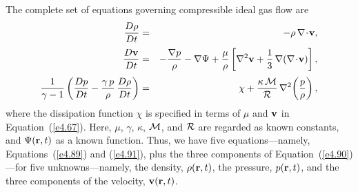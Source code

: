 The complete set of equations governing compressible ideal gas flow are
\begin{eqnarray}
\frac{D\rho}{Dt} &=& -\rho\,\nabla\!\cdot\!{\bf v},\label{e4.89}\\[0.5ex]
\frac{D{\bf v}}{Dt} &=& -\frac{\nabla p}{\rho} - \nabla\Psi+\frac{\mu}{\rho}\left[\nabla^2{\bf v} + \frac{1}{3}\,\nabla(\nabla\!\cdot\!{\bf v})\right],\label{e4.90}\\[0.5ex]
\frac{1}{\gamma-1}\left(\frac{Dp}{Dt} - \frac{\gamma\,p}{\rho}\,\frac{D\rho}{Dt}\right)
&=& \chi + \frac{\kappa\,{\cal M}}{\cal R}\,\nabla^2\!\left(\frac{p}{\rho}\right),\label{e4.91}
\end{eqnarray}
where the dissipation function $\chi$ is specified in terms of $\mu$ and ${\bf v}$ in Equation~(\ref{e4.67}). Here, $\mu$,
$\gamma$, $\kappa$, ${\cal M}$, and ${\cal R}$ are regarded as known constants, and $\Psi({\bf r}, t)$  as a known function. Thus, we have five equations---namely, Equations~(\ref{e4.89}) and (\ref{e4.91}), plus the three components of Equation~(\ref{e4.90})---for five 
unknowns---namely,
the density, $\rho({\bf r},t)$, the pressure, $p({\bf r}, t)$, and the three components of the velocity, ${\bf v}({\bf r}, t)$. 

